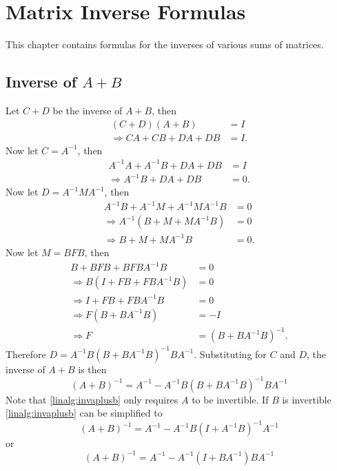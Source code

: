 \section{Matrix Inverse Formulas}
This chapter contains formulas for the inverses of various sums of matrices.

\subsection{Inverse of $A+B$}
Let $C+D$ be the inverse of $A+B$, then
\begin{align}
(C+D)(A+B) &= I \nonumber \\
\Rightarrow CA + CB + DA + DB &= I.
\end{align}
Now let $C=A^{-1}$, then
\begin{align}
A^{-1}A + A^{-1}B + DA + DB & = I \nonumber \\
\Rightarrow A^{-1}B + DA + DB & = 0.
\end{align}
Now let $D=A^{-1}MA^{-1}$, then
\begin{align}
A^{-1}B + A^{-1}M + A^{-1}MA^{-1}B & = 0 \nonumber \\
\Rightarrow A^{-1}\left(B + M + MA^{-1}B\right) &= 0 \nonumber \\
\Rightarrow B + M + MA^{-1}B & = 0.
\end{align}
Now let $M=BFB$, then
\begin{align}
B + BFB + BFBA^{-1}B & = 0 \nonumber \\
\Rightarrow B\left(I + FB + FBA^{-1}B\right) &= 0 \nonumber \\
\Rightarrow I+FB+FBA^{-1}B & = 0 \nonumber \\
\Rightarrow F(B+BA^{-1}B) &= -I \nonumber \\
\Rightarrow F &= (B+BA^{-1}B)^{-1}.
\end{align}
Therefore $D=A^{-1}B(B+BA^{-1}B)^{-1}BA^{-1}$. Substituting for $C$ and $D$, the inverse of $A+B$ is then
\begin{equation}
(A+B)^{-1} = A^{-1} - A^{-1}B(B+BA^{-1}B)^{-1}BA^{-1}
\label{linalg:invaplusb}
\end{equation}
Note that \eqref{linalg:invaplusb} only requires $A$ to be invertible. If $B$ is invertible \eqref{linalg:invaplusb} can be simplified to
\begin{equation}
(A+B)^{-1} = A^{-1} - A^{-1}B(I+A^{-1}B)^{-1}A^{-1}
\end{equation}
or
\begin{equation}
(A+B)^{-1} = A^{-1} - A^{-1}(I+BA^{-1})BA^{-1}
\end{equation}

